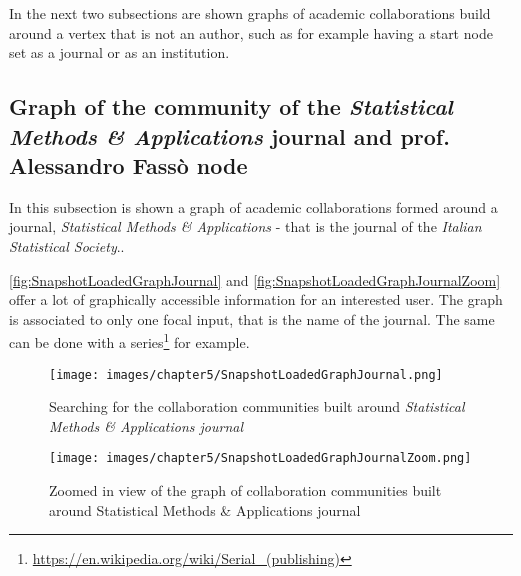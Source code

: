 In the next two subsections are shown graphs of academic collaborations build around a vertex that is not an author, such as for example having a start node set as a journal or as an institution.

\subsection{Graph of the community of the \textit{Statistical Methods \& Applications} journal and prof. Alessandro Fas\-sò no\-de} \label{subsection:Displayoftheresults/Indetailviewofthecollaborationgraph/GraphofthecommunityoftheStatisticalMethodsApplicationsjournalandprofAlessandroFassonode}
In this subsection is shown a graph of academic collaborations formed around a journal, \textit{Statistical Methods \& Applications} - that is the journal of the \textit{Italian Statistical Society}..

\hyperref[fig:SnapshotLoadedGraphJournal]{\autoref{fig:SnapshotLoadedGraphJournal}} and \hyperref[fig:SnapshotLoadedGraphJournalZoom]{\autoref{fig:SnapshotLoadedGraphJournalZoom}} offer a lot of graphically accessible information for an interested user.
The graph is associated to only one focal input, that is the name of the journal.
The same can be done with a series\footnote{\url{https://en.wikipedia.org/wiki/Serial_(publishing)}} for example.

\begin{figure}[H]%
	\centering%
	\texttt{[image: images/chapter5/SnapshotLoadedGraphJournal.png]}%
	\caption[Searching for the collaboration communities built around \textit{Statistical Methods \& Applications} journal]{Searching for the collaboration communities built around \textit{Statistical Methods \& Applications journal}}%
	\label{fig:SnapshotLoadedGraphJournal}%
\end{figure}%

\begin{figure}[H]%
	\centering%
	\texttt{[image: images/chapter5/SnapshotLoadedGraphJournalZoom.png]}%
	\caption[Zoomed in view of the graph of collaboration communities built around Statistical Methods \& Applications journal]{Zoomed in view of the graph of collaboration communities built around Statistical Methods \& Applications journal}%
	\label{fig:SnapshotLoadedGraphJournalZoom}%
\end{figure}%

